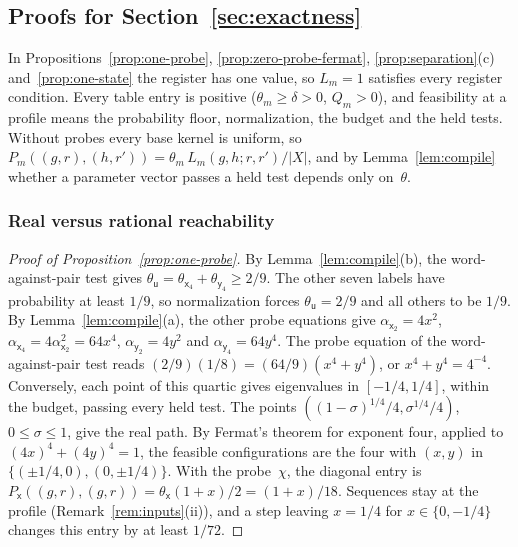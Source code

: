 
\subsection{Proofs for Section~\ref{sec:exactness}}\label{app:exactness-proofs}

In Propositions~\ref{prop:one-probe}, \ref{prop:zero-probe-fermat},
\ref{prop:separation}(c) and~\ref{prop:one-state} the register has one
value, so $L_m=1$ satisfies every register condition. Every table entry
is positive ($\theta_m\ge\delta>0$, $Q_m>0$), and feasibility at a profile
means the probability floor, normalization, the budget and the held
tests. Without probes every base kernel is
uniform, so $P_m((g,r),(h,r'))=\theta_m\,L_m(g,h;r,r')/|X|$, and by
Lemma~\ref{lem:compile} whether a parameter vector passes a held test
depends only on~$\theta$.

\subsubsection{Real versus rational reachability}\label{app:real-rational}

\begin{proof}[Proof of Proposition~\ref{prop:one-probe}]
By Lemma~\ref{lem:compile}(b), the word-against-pair test gives
$\theta_{\mathsf u}=\theta_{\mathsf x_4}+\theta_{\mathsf y_4}\ge2/9$. The
other seven labels have probability at least $1/9$, so normalization forces
$\theta_{\mathsf u}=2/9$ and all others to be $1/9$. By
Lemma~\ref{lem:compile}(a), the other probe equations give
$\alpha_{\mathsf x_2}=4x^2$, $\alpha_{\mathsf x_4}=4\alpha_{\mathsf
x_2}^2=64x^4$, $\alpha_{\mathsf y_2}=4y^2$ and $\alpha_{\mathsf
y_4}=64y^4$. The probe equation of the word-against-pair test reads
$(2/9)(1/8)=(64/9)(x^4+y^4)$, or $x^4+y^4=4^{-4}$. Conversely, each
point of this quartic gives eigenvalues in $[-1/4,1/4]$, within the
budget, passing every held test. The
points $((1-\sigma)^{1/4}/4,\sigma^{1/4}/4)$, $0\le\sigma\le1$, give the
real path. By Fermat's theorem for exponent four, applied to
$(4x)^4+(4y)^4=1$, the feasible configurations are the four with $(x,y)$
in $\{(\pm1/4,0),(0,\pm1/4)\}$. With the probe~$\chi$, the diagonal entry
is $P_{\mathsf x}((g,r),(g,r))=\theta_{\mathsf x}(1+x)/2=(1+x)/18$. Sequences
stay at the profile (Remark~\ref{rem:inputs}(ii)), and a step leaving $x=1/4$ for
$x\in\{0,-1/4\}$ changes this entry by at least $1/72$.
\end{proof}

